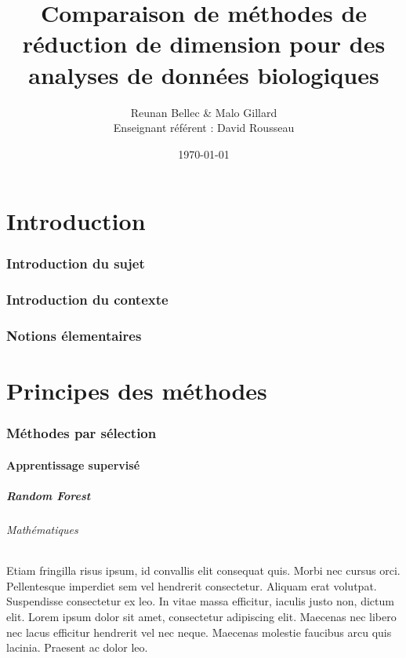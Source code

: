 \documentclass[12pt]{article}
\title{\textbf{Comparaison de méthodes de réduction de dimension pour des analyses de données biologiques}}
\author{Reunan Bellec \& Malo Gillard \\ Enseignant référent : David Rousseau}
\date{\today} %
\begin{document}
\maketitle

\newpage

\tableofcontents

\newpage
\part{Introduction}

\section*{Introduction du sujet}

\section*{Introduction du contexte}

\section*{Notions élementaires}

\newpage
\part{Principes des méthodes}

\section{Méthodes par sélection}


\subsection{Apprentissage supervisé}

\subsubsection{Random Forest}

\paragraph{Mathématiques}
Etiam fringilla risus ipsum, id convallis elit consequat quis. Morbi nec cursus orci. Pellentesque imperdiet sem vel hendrerit consectetur. Aliquam erat volutpat. Suspendisse consectetur ex leo. In vitae massa efficitur, iaculis justo non, dictum elit. Lorem ipsum dolor sit amet, consectetur adipiscing elit. Maecenas nec libero nec lacus efficitur hendrerit vel nec neque. Maecenas molestie faucibus arcu quis lacinia. Praesent ac dolor leo. 
 
\end{document}

